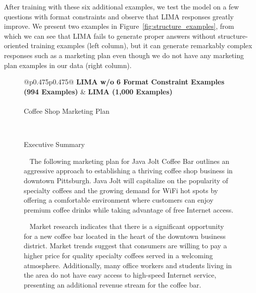 \documentclass{article}
\begin{document}
After training with these six additional examples, we test the model on a few questions with format constraints and observe that LIMA responses greatly improve.
We present two examples in Figure~\ref{fig:structure_examples}, from which we can see that LIMA fails to generate proper answers without structure-oriented training examples (left column), but it can generate remarkably complex responses such as a marketing plan even though we do not have any marketing plan examples in our data (right column).

 \begin{figure}[p]
    \scriptsize
    \centering
    \begin{tabular}{@{}p{}p{}@{}}
    \toprule
    \textbf{LIMA w/o 6 Format Constraint Examples (994 Examples)} &  \textbf{LIMA (1,000 Examples)}\\
    \midrule
    \\
    \midrule
    Coffee Shop Marketing Plan
    
    ~
    
    Executive Summary

    ~
    The following marketing plan for Java Jolt Coffee Bar outlines an aggressive approach to establishing a thriving coffee shop business in downtown Pittsburgh. Java Jolt will capitalize on the popularity of specialty coffees and the growing demand for WiFi hot spots by offering a comfortable environment where customers can enjoy premium coffee drinks while taking advantage of free Internet access.
    
    ~
    Market research indicates that there is a significant opportunity for a new coffee bar located in the heart of the downtown business district. Market trends suggest that consumers are willing to pay a higher price for quality specialty coffees served in a welcoming atmosphere. Additionally, many office workers and students living in the area do not have easy access to high-speed Internet service, presenting an additional revenue stream for the coffee bar.

    ~
    

\end{tabular}
\end{figure}
\end{document}
